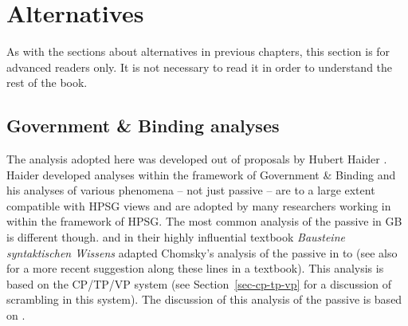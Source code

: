 



\section{Alternatives}

As with the sections about alternatives in previous chapters, this section is for advanced readers
only. It is not necessary to read it in order to understand the rest of the book.


\subsection{Government \& Binding analyses}
\label{sec-passive-GB}

The analysis adopted here was developed out of proposals by Hubert Haider
\citeyearpar{Haider86}. Haider developed analyses within the framework of Government \& Binding
\citep{Chomsky81a} and his analyses of various phenomena -- not just passive -- are to a large extent compatible with HPSG views and are adopted
by many researchers working in  within the framework of HPSG. The most common analysis of the
passive in GB is different though.  \textcites[155--157]{Grewendorf88a}[]{Grewendorf93} and
\citet[462--463]{SS88a} in their highly influential textbook \emph{Bausteine syntaktischen Wissens} adapted Chomsky's analysis of the passive in
 \citep[]{Chomsky81a} to  (see also \citealt[]{Lohnstein2014a} for a
more recent suggestion along these lines in a textbook). This analysis is based on the CP/TP/VP system (see Section~\ref{sec-cp-tp-vp} for a discussion of
scrambling in this system). The discussion of this analysis of the passive is based on .


